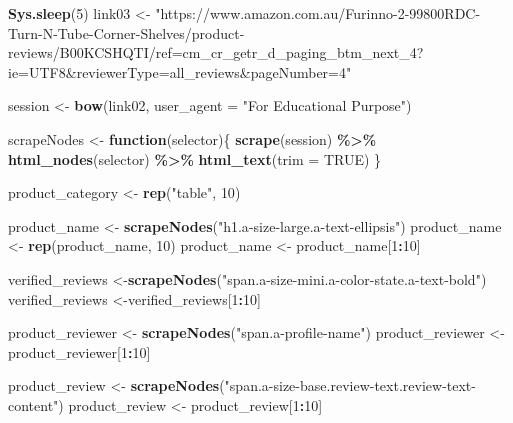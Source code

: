\documentclass[
]{article}
\newenvironment{Shaded}{\begin{snugshade}}{\end{snugshade}}
\newcommand{\AttributeTok}[1]{\textcolor[rgb]{0.13,0.29,0.53}{#1}}
\newcommand{\ConstantTok}[1]{\textcolor[rgb]{0.56,0.35,0.01}{#1}}
\newcommand{\ControlFlowTok}[1]{\textcolor[rgb]{0.13,0.29,0.53}{\textbf{#1}}}
\newcommand{\DecValTok}[1]{\textcolor[rgb]{0.00,0.00,0.81}{#1}}
\newcommand{\FunctionTok}[1]{\textcolor[rgb]{0.13,0.29,0.53}{\textbf{#1}}}
\newcommand{\NormalTok}[1]{#1}
\newcommand{\OtherTok}[1]{\textcolor[rgb]{0.56,0.35,0.01}{#1}}
\newcommand{\SpecialCharTok}[1]{\textcolor[rgb]{0.81,0.36,0.00}{\textbf{#1}}}
\newcommand{\StringTok}[1]{\textcolor[rgb]{0.31,0.60,0.02}{#1}}
\begin{document}
\begin{Shaded}
\begin{Highlighting}[]
   \FunctionTok{Sys.sleep}\NormalTok{(}\DecValTok{5}\NormalTok{)}
\NormalTok{link03 }\OtherTok{\textless{}{-}} \StringTok{"https://www.amazon.com.au/Furinno{-}2{-}99800RDC{-}Turn{-}N{-}Tube{-}Corner{-}Shelves/product{-}reviews/B00KCSHQTI/ref=cm\_cr\_getr\_d\_paging\_btm\_next\_4?ie=UTF8\&reviewerType=all\_reviews\&pageNumber=4"}


\NormalTok{  session }\OtherTok{\textless{}{-}} \FunctionTok{bow}\NormalTok{(link02,}
               \AttributeTok{user\_agent =} \StringTok{"For Educational Purpose"}\NormalTok{)}

\NormalTok{  scrapeNodes }\OtherTok{\textless{}{-}} \ControlFlowTok{function}\NormalTok{(selector)\{}
    \FunctionTok{scrape}\NormalTok{(session) }\SpecialCharTok{\%\textgreater{}\%}
      \FunctionTok{html\_nodes}\NormalTok{(selector) }\SpecialCharTok{\%\textgreater{}\%}
      \FunctionTok{html\_text}\NormalTok{(}\AttributeTok{trim =} \ConstantTok{TRUE}\NormalTok{)}
\NormalTok{  \}}

\NormalTok{  product\_category }\OtherTok{\textless{}{-}} \FunctionTok{rep}\NormalTok{(}\StringTok{"table"}\NormalTok{, }\DecValTok{10}\NormalTok{)}

\NormalTok{  product\_name }\OtherTok{\textless{}{-}} \FunctionTok{scrapeNodes}\NormalTok{(}\StringTok{"h1.a{-}size{-}large.a{-}text{-}ellipsis"}\NormalTok{)}
\NormalTok{  product\_name }\OtherTok{\textless{}{-}} \FunctionTok{rep}\NormalTok{(product\_name, }\DecValTok{10}\NormalTok{)}
\NormalTok{  product\_name }\OtherTok{\textless{}{-}}\NormalTok{ product\_name[}\DecValTok{1}\SpecialCharTok{:}\DecValTok{10}\NormalTok{]}
  
\NormalTok{  verified\_reviews }\OtherTok{\textless{}{-}}\FunctionTok{scrapeNodes}\NormalTok{(}\StringTok{"span.a{-}size{-}mini.a{-}color{-}state.a{-}text{-}bold"}\NormalTok{)}
\NormalTok{  verified\_reviews }\OtherTok{\textless{}{-}}\NormalTok{verified\_reviews[}\DecValTok{1}\SpecialCharTok{:}\DecValTok{10}\NormalTok{]}
  
\NormalTok{  product\_reviewer }\OtherTok{\textless{}{-}} \FunctionTok{scrapeNodes}\NormalTok{(}\StringTok{"span.a{-}profile{-}name"}\NormalTok{)}
\NormalTok{  product\_reviewer }\OtherTok{\textless{}{-}}\NormalTok{ product\_reviewer[}\DecValTok{1}\SpecialCharTok{:}\DecValTok{10}\NormalTok{]}
  
\NormalTok{  product\_review }\OtherTok{\textless{}{-}} \FunctionTok{scrapeNodes}\NormalTok{(}\StringTok{"span.a{-}size{-}base.review{-}text.review{-}text{-}content"}\NormalTok{)}
\NormalTok{  product\_review }\OtherTok{\textless{}{-}}\NormalTok{ product\_review[}\DecValTok{1}\SpecialCharTok{:}\DecValTok{10}\NormalTok{]}
  

\end{Highlighting}
\end{Shaded}
\end{document}

